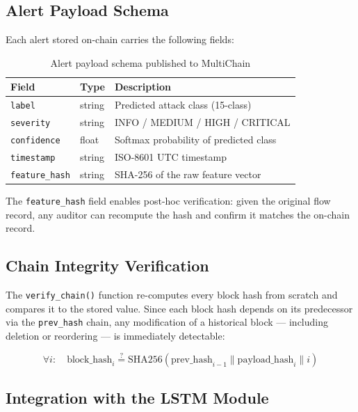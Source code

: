 \documentclass[12pt]{article}
\theoremstyle{plain}
\begin{document}
\subsection{Alert Payload Schema}

Each alert stored on-chain carries the following fields:

\begin{table}[H]
\centering
\caption{Alert payload schema published to MultiChain}
\label{tab:payload}
\renewcommand{\arraystretch}{1.2}
\begin{tabular}{lll}
\toprule
\rowcolor{lightblue}
\textbf{Field} & \textbf{Type} & \textbf{Description} \\
\midrule
\texttt{label}        & string  & Predicted attack class (15-class) \\
\texttt{severity}     & string  & INFO / MEDIUM / HIGH / CRITICAL \\
\texttt{confidence}   & float   & Softmax probability of predicted class \\
\texttt{timestamp}    & string  & ISO-8601 UTC timestamp \\
\texttt{feature\_hash}& string  & SHA-256 of the raw feature vector \\
\bottomrule
\end{tabular}
\end{table}

The \texttt{feature\_hash} field enables post-hoc verification: given the original flow record, any auditor can recompute the hash and confirm it matches the on-chain record.

\subsection{Chain Integrity Verification}

The \texttt{verify\_chain()} function re-computes every block hash from scratch and compares it to the stored value. Since each block hash depends on its predecessor via the \texttt{prev\_hash} chain, any modification of a historical block — including deletion or reordering — is immediately detectable:

\begin{equation}
\forall i: \quad \text{block\_hash}_i \stackrel{?}{=} \text{SHA256}(\text{prev\_hash}_{i-1} \| \text{payload\_hash}_i \| i)
\end{equation}

\subsection{Integration with the LSTM Module}
\end{document}
